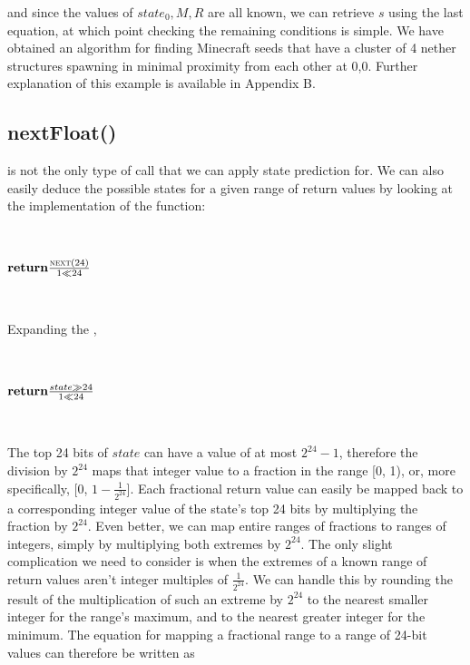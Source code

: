 \documentclass{article}
\begin{document}
and since the values of $state_0, M, R$ are all known, we can retrieve $s$ using the last equation, at which point checking the remaining conditions is simple. We have obtained an algorithm for finding Minecraft seeds that have a cluster of 4 nether structures spawning in minimal proximity from each other at 0,0. Further explanation of this example is available in Appendix B. %

\subsection{ nextFloat() }

 is not the only type of call that we can apply state prediction for. We can also easily deduce the possible states for a given range of  return values by looking at the implementation of the function:

\
\begin{algorithmic}
\State $\Return \frac{\Call{next}{24}}{1 \ll 24}$
\EndFunction
\end{algorithmic}
\ \

\noindent Expanding the \Call{next}{24},

\
\begin{algorithmic}
\Function{nextFloat}{}
\State \Call{nextSeed}{}
\State $\Return \frac{state \gg 24}{1 \ll 24}$
\EndFunction
\end{algorithmic}
\ \

\noindent The top 24 bits of $state$ can have a value of at most $2^{24} - 1$, therefore the division by $2^{24}$ maps that integer value to a fraction in the range [0, 1), or, more specifically,
[0, $1 - \frac{1}{2^{24}}$]. Each fractional  return value can easily be mapped back to a corresponding integer value of the state's top 24 bits by multiplying the fraction by $2^{24}$. 
Even better, we can map entire ranges of fractions to ranges of integers, simply by multiplying both extremes by $2^{24}$. The only slight complication we need to consider is when the extremes of a known range of  return values aren't integer multiples of $\frac{1}{2^{24}}$. We can handle this by rounding the result of the multiplication of such an extreme by $2^{24}$ to the nearest smaller integer for the range's maximum, and to the nearest greater integer for the minimum. 
The equation for mapping a fractional range to a range of 24-bit values can therefore be written as
\end{document}
